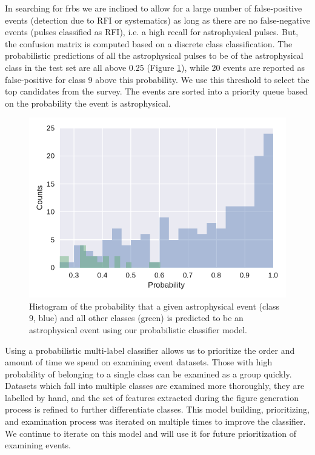 \documentclass[a4paper,fleqn,usenatbib]{mnras}
\begin{document}
In searching for \glspl{frb} we are inclined to allow for a large number
of false-positive events (detection due to RFI or systematics) as long as there
are no false-negative events (pulses classified as RFI), i.e. a high recall for
astrophysical pulses. But, the confusion matrix is computed based on a discrete
class classification. The probabilistic predictions of all the astrophysical
pulses to be of the astrophysical class in the test set are all above 0.25
(Figure \ref{fig:class_hist}), while 20 events are reported as
false-positive for class 9 above this probability. We use this threshold to
select the top candidates from the survey. The events are sorted into a priority
queue based on the probability the event is astrophysical.

\begin{figure}
    \includegraphics[width=1.0\linewidth]{figures/class9_hist.pdf}
    \caption{Histogram of the probability that a given astrophysical event
    (class 9, blue) and all other classes (green) is predicted to be an
    astrophysical event using our probabilistic classifier model.
    }
    \label{fig:class_hist}
\end{figure}

Using a probabilistic multi-label classifier allows us to prioritize the order
and amount of time we spend on examining event datasets. Those with high
probability of belonging to a single class can be examined as a group quickly.
Datasets which fall into multiple classes are examined more thoroughly, they are
labelled by hand, and the set of features extracted during the figure generation
process is refined to further differentiate classes. This model building,
prioritizing, and examination process was iterated on multiple times to improve
the classifier. We continue to iterate on this model and will use it for future
prioritization of examining events.
\end{document}

